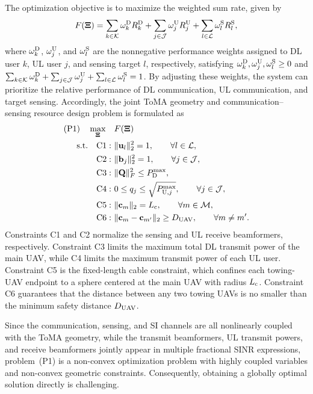 \documentclass[letterpaper,journal]{IEEEtran}
\begin{document}
The optimization objective is to maximize the weighted sum rate, given by
\begin{equation}
F(\boldsymbol{\Xi})
=
\sum_{k\in\mathcal K}
\omega_k^{\rm D}R_k^{\rm D}
+
\sum_{j\in\mathcal J}
\omega_j^{\rm U}R_j^{\rm U}
+
\sum_{l\in\mathcal L}
\omega_l^{\rm S}R_l^{\rm S},
\label{eq:wsr}
\end{equation}
where $\omega_k^{\rm D}$, $\omega_j^{\rm U}$, and $\omega_l^{\rm S}$ are the nonnegative performance weights assigned to DL user $k$, UL user $j$, and sensing target $l$, respectively, satisfying $\omega_k^{\rm D},\omega_j^{\rm U},\omega_l^{\rm S}\ge0$ and $\sum_{k\in\mathcal K}\omega_k^{\rm D}+\sum_{j\in\mathcal J}\omega_j^{\rm U}+\sum_{l\in\mathcal L}\omega_l^{\rm S}=1$. By adjusting these weights, the system can prioritize the relative performance of DL communication, UL communication, and target sensing. Accordingly, the joint ToMA geometry and communication--sensing resource design problem is formulated as
\begin{equation}
\begin{aligned}
\text{(P1)}\quad
\max_{\boldsymbol{\Xi}}\quad
&
F(\boldsymbol{\Xi})
\\
\text{s.t.}\quad
\mathrm{C1}:~&
\|\mathbf u_l\|_2^2=1,
\qquad
\forall l\in\mathcal L,
\\
\mathrm{C2}:~&
\|\mathbf b_j\|_2^2=1,
\qquad
\forall j\in\mathcal J,
\\
\mathrm{C3}:~&
\|\mathbf Q\|_F^2
\le
P_{\rm D}^{\max},
\\
\mathrm{C4}:~&
0\le q_j
\le
\sqrt{P_{{\rm U},j}^{\max}},
\qquad
\forall j\in\mathcal J,
\\
\mathrm{C5}:~&
\|\mathbf c_m\|_2
=
L_{\rm c},
\qquad
\forall m\in\mathcal M,
\\
\mathrm{C6}:~&
\|\mathbf c_m-\mathbf c_{m'}\|_2
\ge
D_{\rm UAV},
\qquad
\forall m\neq m'.
\end{aligned}
\label{eq:P1}
\end{equation}
Constraints C1 and C2 normalize the sensing and UL receive beamformers, respectively. Constraint C3 limits the maximum total DL transmit power of the main UAV, while C4 limits the maximum transmit power of each UL user. Constraint C5 is the fixed-length cable constraint, which confines each towing-UAV endpoint to a sphere centered at the main UAV with radius $L_{\rm c}$. Constraint C6 guarantees that the distance between any two towing UAVs is no smaller than the minimum safety distance $D_{\rm UAV}$.

Since the communication, sensing, and SI channels are all nonlinearly coupled with the ToMA geometry, while the transmit beamformers, UL transmit powers, and receive beamformers jointly appear in multiple fractional SINR expressions, problem~(P1) is a non-convex optimization problem with highly coupled variables and non-convex geometric constraints. Consequently, obtaining a globally optimal solution directly is challenging.
\end{document}
